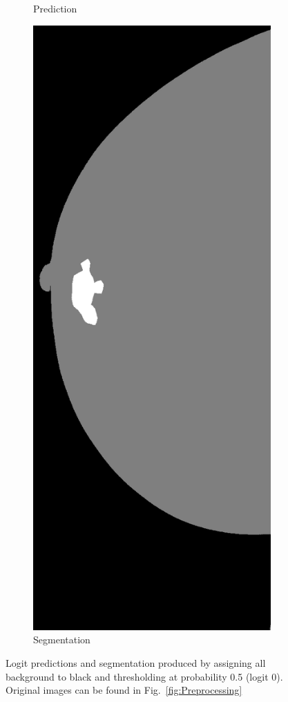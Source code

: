 \begin{figure}[h]
\begin{subfigure}{0.17\textwidth}
         \caption{Prediction}
	\end{subfigure}
	\quad
	\begin{subfigure}{0.17\textwidth}
		\centering
                \includegraphics[width=\textwidth]{plots/segmentation.png}
         \caption{Segmentation}
	\end{subfigure}
	\caption[Post-processing pipeline]{Logit predictions and segmentation produced by assigning all background to black and thresholding at probability 0.5 (logit 0). Original images can be found in Fig.~\ref{fig:Preprocessing}}
	 \label{fig:Post-processing}
\end{figure}

